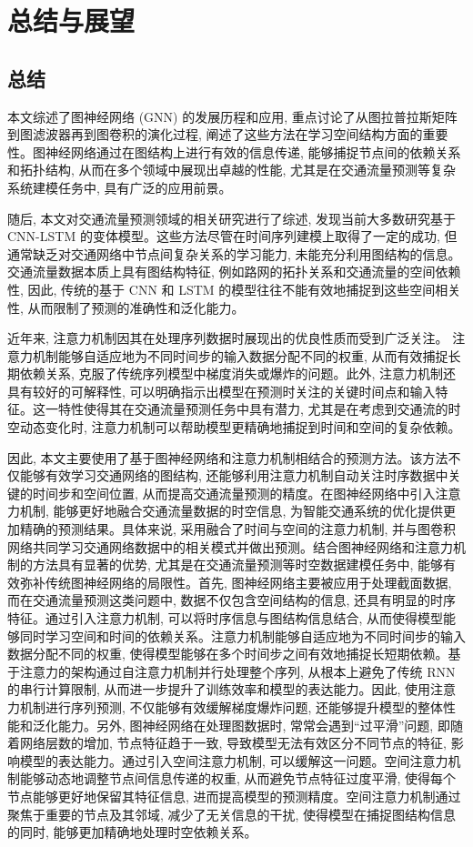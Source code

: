 
\chapter{总结与展望}
\section{总结}


本文综述了图神经网络 (GNN) 的发展历程和应用, 重点讨论了从图拉普拉斯矩阵到图滤波器再到图卷积的演化过程, 阐述了这些方法在学习空间结构方面的重要性。图神经网络通过在图结构上进行有效的信息传递, 能够捕捉节点间的依赖关系和拓扑结构, 从而在多个领域中展现出卓越的性能, 尤其是在交通流量预测等复杂系统建模任务中, 具有广泛的应用前景。

随后, 本文对交通流量预测领域的相关研究进行了综述, 发现当前大多数研究基于 CNN-LSTM 的变体模型。这些方法尽管在时间序列建模上取得了一定的成功, 但通常缺乏对交通网络中节点间复杂关系的学习能力, 未能充分利用图结构的信息。交通流量数据本质上具有图结构特征, 例如路网的拓扑关系和交通流量的空间依赖性, 因此, 传统的基于 CNN 和 LSTM 的模型往往不能有效地捕捉到这些空间相关性, 从而限制了预测的准确性和泛化能力。

近年来, 注意力机制因其在处理序列数据时展现出的优良性质而受到广泛关注。 注意力机制能够自适应地为不同时间步的输入数据分配不同的权重, 从而有效捕捉长期依赖关系, 克服了传统序列模型中梯度消失或爆炸的问题。此外, 注意力机制还具有较好的可解释性, 可以明确指示出模型在预测时关注的关键时间点和输入特征。这一特性使得其在交通流量预测任务中具有潜力, 尤其是在考虑到交通流的时空动态变化时, 注意力机制可以帮助模型更精确地捕捉到时间和空间的复杂依赖。

因此, 本文主要使用了基于图神经网络和注意力机制相结合的预测方法。该方法不仅能够有效学习交通网络的图结构, 还能够利用注意力机制自动关注时序数据中关键的时间步和空间位置, 从而提高交通流量预测的精度。在图神经网络中引入注意力机制, 能够更好地融合交通流量数据的时空信息, 为智能交通系统的优化提供更加精确的预测结果。具体来说, 采用融合了时间与空间的注意力机制, 并与图卷积网络共同学习交通网络数据中的相关模式并做出预测。结合图神经网络和注意力机制的方法具有显著的优势, 尤其是在交通流量预测等时空数据建模任务中, 能够有效弥补传统图神经网络的局限性。首先, 图神经网络主要被应用于处理截面数据, 而在交通流量预测这类问题中, 数据不仅包含空间结构的信息, 还具有明显的时序特征。通过引入注意力机制, 可以将时序信息与图结构信息结合, 从而使得模型能够同时学习空间和时间的依赖关系。注意力机制能够自适应地为不同时间步的输入数据分配不同的权重, 使得模型能够在多个时间步之间有效地捕捉长短期依赖。基于注意力的架构通过自注意力机制并行处理整个序列, 从根本上避免了传统 RNN 的串行计算限制, 从而进一步提升了训练效率和模型的表达能力。因此, 使用注意力机制进行序列预测, 不仅能够有效缓解梯度爆炸问题, 还能够提升模型的整体性能和泛化能力。另外, 图神经网络在处理图数据时, 常常会遇到“过平滑”问题, 即随着网络层数的增加, 节点特征趋于一致, 导致模型无法有效区分不同节点的特征, 影响模型的表达能力。通过引入空间注意力机制, 可以缓解这一问题。空间注意力机制能够动态地调整节点间信息传递的权重, 从而避免节点特征过度平滑, 使得每个节点能够更好地保留其特征信息, 进而提高模型的预测精度。空间注意力机制通过聚焦于重要的节点及其邻域, 减少了无关信息的干扰, 使得模型在捕捉图结构信息的同时, 能够更加精确地处理时空依赖关系。


